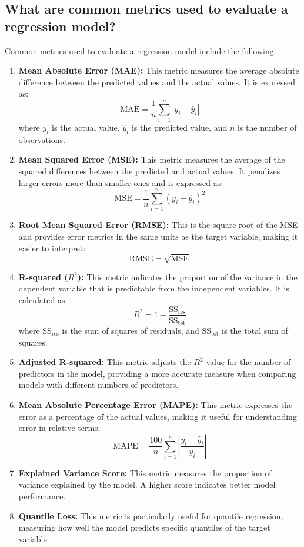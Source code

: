 \subsection{What are common metrics used to evaluate a regression model?}

Common metrics used to evaluate a regression model include the following:

\begin{enumerate}
    \item \textbf{Mean Absolute Error (MAE):} 
    This metric measures the average absolute difference between the predicted values and the actual values. It is expressed as:
    \[
    \text{MAE} = \frac{1}{n} \sum_{i=1}^{n} |y_i - \hat{y}_i|
    \]
    where \(y_i\) is the actual value, \(\hat{y}_i\) is the predicted value, and \(n\) is the number of observations.

    \item \textbf{Mean Squared Error (MSE):} 
    This metric measures the average of the squared differences between the predicted and actual values. It penalizes larger errors more than smaller ones and is expressed as:
    \[
    \text{MSE} = \frac{1}{n} \sum_{i=1}^{n} (y_i - \hat{y}_i)^2
    \]

    \item \textbf{Root Mean Squared Error (RMSE):} 
    This is the square root of the MSE and provides error metrics in the same units as the target variable, making it easier to interpret:
    \[
    \text{RMSE} = \sqrt{\text{MSE}}
    \]

    \item \textbf{R-squared (\(R^2\)):} 
    This metric indicates the proportion of the variance in the dependent variable that is predictable from the independent variables. It is calculated as:
    \[
    R^2 = 1 - \frac{\text{SS}_{\text{res}}}{\text{SS}_{\text{tot}}}
    \]
    where \(\text{SS}_{\text{res}}\) is the sum of squares of residuals, and \(\text{SS}_{\text{tot}}\) is the total sum of squares.

    \item \textbf{Adjusted R-squared:} 
    This metric adjusts the \(R^2\) value for the number of predictors in the model, providing a more accurate measure when comparing models with different numbers of predictors.

    \item \textbf{Mean Absolute Percentage Error (MAPE):} 
    This metric expresses the error as a percentage of the actual values, making it useful for understanding error in relative terms:
    \[
    \text{MAPE} = \frac{100}{n} \sum_{i=1}^{n} \left|\frac{y_i - \hat{y}_i}{y_i}\right|
    \]

    \item \textbf{Explained Variance Score:} 
    This metric measures the proportion of variance explained by the model. A higher score indicates better model performance.

    \item \textbf{Quantile Loss:} 
    This metric is particularly useful for quantile regression, measuring how well the model predicts specific quantiles of the target variable.
\end{enumerate}



